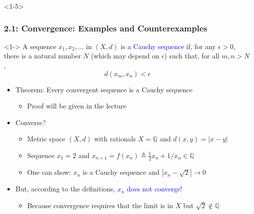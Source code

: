 \documentclass[10pt,english,aspectratio=169,handout]{beamer}
\begin{document}
\begin{frame}<1-5> \frametitle{2.1: Convergence: Examples and Counterexamples}

\begin{definition}<1->
A sequence $x_1,x_2,\ldots$ in $(X,d)$ is a \textcolor{blue}{Cauchy sequence} if, for any $\epsilon >0$, there is a natural number $N$ (which may depend on $\epsilon$) such that, for all $m,n > N$,\vspace{-2mm}
\begin{equation*}
d \left( x_m, x_n \right) < \epsilon
\end{equation*}
\end{definition}

\begin{itemize}
\setlength\itemsep{3mm}
\item<2-> Theorem: Every convergent sequence is a Cauchy sequence \vspace{1mm}
\begin{itemize} 
  \setlength\itemsep{1.5mm}
  \item Proof will be given in the lecture \pause
\end{itemize}
\item<3-> Converse?  \vspace{1mm}
\begin{itemize} 
  \setlength\itemsep{1.5mm}
  \item<4-> Metric space $(X,d)$ with rationals $X=\mathbb{Q}$ and $d(x,y)=|x-y|$
  \item<4-> Sequence $x_1 = 2$ and $x_{n+1} = f(x_n) \triangleq \frac{1}{2} x_n + 1/x_n \in \mathbb{Q} $
  \item<4-> One can show: $x_n$ is a Cauchy sequence and $|x_n - \sqrt{2}|\to 0$
\end{itemize}
\item<5-> But, according to the definitions, \textcolor{blue}{$x_n$ does not converge!}  \vspace{1mm}
\begin{itemize} 
  \setlength\itemsep{1.5mm}
  \item Because convergence requires that the limit is in $X$ but $\sqrt{2} \notin \mathbb{Q}$
\end{itemize}
\end{itemize}


\end{frame}
\end{document}
